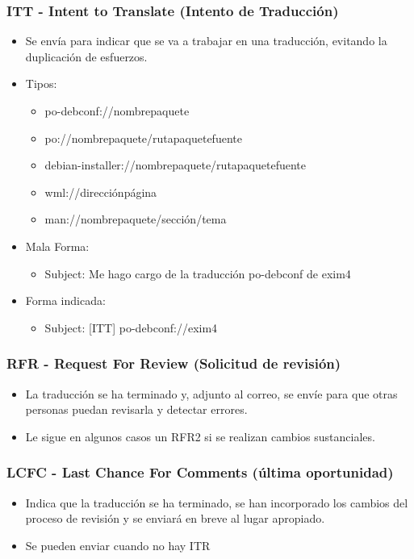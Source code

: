 \documentclass{beamer}
\begin{document}
\begin{frame}
  \frametitle {ITT - Intent to Translate (Intento de Traducción)}
  \begin{itemize}
  \item Se envía para indicar que se va a trabajar en una traducción, evitando la duplicación de esfuerzos.  
  \item Tipos:
    \begin{itemize}
      \item po-debconf://nombrepaquete 
      \item po://nombrepaquete/rutapaquetefuente
      \item debian-installer://nombrepaquete/rutapaquetefuente 
      \item wml://direcciónpágina 
      \item man://nombrepaquete/sección/tema 
    \end{itemize}
  \item Mala Forma: 
    \begin{itemize}
    \item Subject: Me hago cargo de la traducción po-debconf de exim4 
    \end{itemize}
  \item Forma indicada:
     \begin{itemize}
    \item Subject: [ITT] po-debconf://exim4 
    \end{itemize}
  \end{itemize}
\end{frame}

\begin{frame}
  \frametitle {RFR - Request For Review (Solicitud de revisión)}
  \begin{itemize}
  \item La traducción se ha terminado y, adjunto al correo, se envíe para que otras personas puedan revisarla y detectar errores.
  \item Le sigue en algunos casos un RFR2 si se realizan cambios sustanciales.
  \end{itemize}
\end{frame}

\begin{frame}
  \frametitle {LCFC - Last Chance For Comments (última oportunidad)}
  \begin{itemize}
  \item Indica que la traducción se ha terminado, se han incorporado los cambios del proceso de revisión y se enviará en breve al lugar apropiado.
  \item Se pueden enviar cuando no hay ITR
  \end{itemize}
\end{frame}
\end{document}

